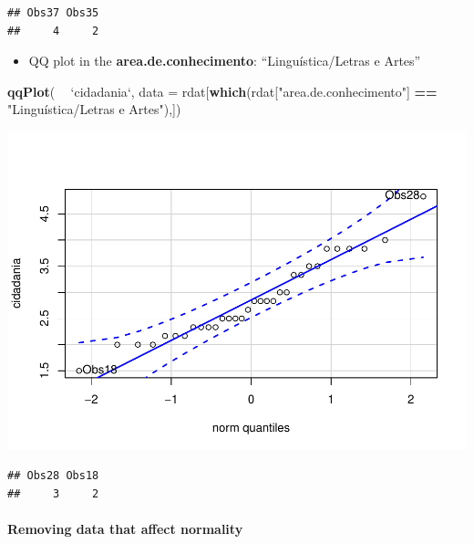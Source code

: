 \documentclass[]{article}
\newenvironment{Shaded}{\begin{snugshade}}{\end{snugshade}}
\newcommand{\CommentTok}[1]{\textcolor[rgb]{0.56,0.35,0.01}{\textit{#1}}}
\newcommand{\DataTypeTok}[1]{\textcolor[rgb]{0.13,0.29,0.53}{#1}}
\newcommand{\KeywordTok}[1]{\textcolor[rgb]{0.13,0.29,0.53}{\textbf{#1}}}
\newcommand{\NormalTok}[1]{#1}
\newcommand{\OperatorTok}[1]{\textcolor[rgb]{0.81,0.36,0.00}{\textbf{#1}}}
\newcommand{\StringTok}[1]{\textcolor[rgb]{0.31,0.60,0.02}{#1}}
\providecommand{\tightlist}{%
  \setlength{\itemsep}{0pt}\setlength{\parskip}{0pt}}
\let\oldparagraph\paragraph
\renewcommand{\paragraph}[1]{\oldparagraph{#1}\mbox{}}
\begin{document}
\begin{verbatim}
## Obs37 Obs35 
##     4     2
\end{verbatim}

\begin{itemize}
\tightlist
\item
  QQ plot in the \textbf{area.de.conhecimento}: ``Linguística/Letras e
  Artes''
\end{itemize}

\begin{Shaded}
\begin{Highlighting}[]
\KeywordTok{qqPlot}\NormalTok{( }\OperatorTok{~}\StringTok{ `}\DataTypeTok{cidadania}\StringTok{`}\NormalTok{, }\DataTypeTok{data =}\NormalTok{ rdat[}\KeywordTok{which}\NormalTok{(rdat[}\StringTok{"area.de.conhecimento"}\NormalTok{] }\OperatorTok{==}\StringTok{ "Linguística/Letras e Artes"}\NormalTok{),])}
\end{Highlighting}
\end{Shaded}

\includegraphics{factorialAnova_files/figure-latex/unnamed-chunk-16-1.pdf}

\begin{verbatim}
## Obs28 Obs18 
##     3     2
\end{verbatim}

\hypertarget{removing-data-that-affect-normality}{%
\paragraph{Removing data that affect
normality}\label{removing-data-that-affect-normality}}

\begin{Shaded}
\end{Shaded}
\end{document}
